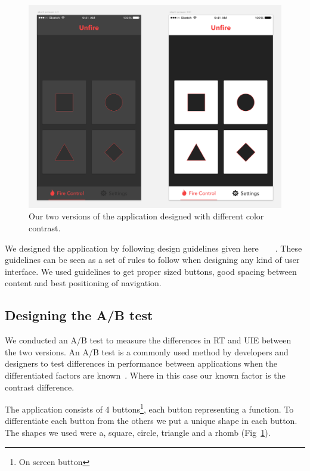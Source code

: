 \documentclass[runningheads,a4paper]{llncs}
\begin{document}
\begin{figure}
	\centering
	\includegraphics[width=\textwidth]{application}
	\caption{Our two versions of the application designed with different color contrast.
	\label{fig:application}}
\end{figure}

We designed the application by following design guidelines given here~\cite{hoober2011designing}~\cite{johnson2013designing}~\cite{gong2004guidelines}~\cite{norman2013design}. These guidelines can be seen as a set of rules to follow when designing any kind of user interface. We used guidelines to get proper sized buttons, good spacing between content and best positioning of navigation.

\subsection{Designing the A/B test}
We conducted an A/B test to measure the differences in RT and UIE between the two versions. An A/B test is a commonly used method by developers and designers to test differences in performance between applications when the differentiated factors are known~\cite{johnson2013designing}. Where in this case our known factor is the contrast difference. 

The application consists of 4 buttons\footnote{On screen button}, each button representing a function. To differentiate each button from the others we put a unique shape in each button. The shapes we used were a, square, circle, triangle and a rhomb (Fig~\ref{fig:application}).
\end{document}
